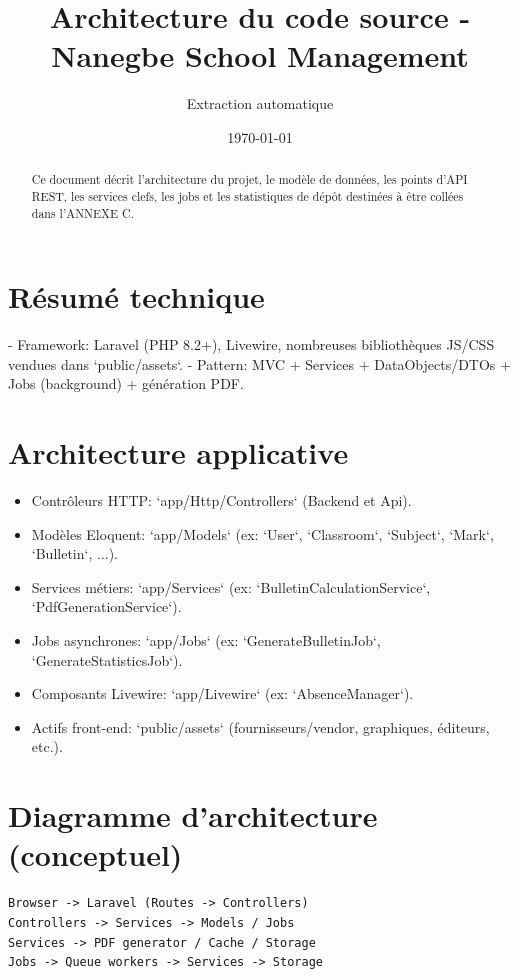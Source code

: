 \documentclass[a4paper,11pt]{article}
\title{Architecture du code source - Nanegbe School Management}
\author{Extraction automatique}
\date{\today}
\begin{document}
\maketitle
\begin{abstract}
Ce document décrit l'architecture du projet, le modèle de données, les points d'API REST, les services clefs, les jobs et les statistiques de dépôt destinées à être collées dans l'ANNEXE C.
\end{abstract}

\section{Résumé technique}
- Framework: Laravel (PHP 8.2+), Livewire, nombreuses bibliothèques JS/CSS vendues dans `public/assets`.
- Pattern: MVC + Services + DataObjects/DTOs + Jobs (background) + génération PDF.

\section{Architecture applicative}
\begin{itemize}
  \item Contrôleurs HTTP: `app/Http/Controllers` (Backend et Api).
  \item Modèles Eloquent: `app/Models` (ex: `User`, `Classroom`, `Subject`, `Mark`, `Bulletin`, ...).
  \item Services métiers: `app/Services` (ex: `BulletinCalculationService`, `PdfGenerationService`).
  \item Jobs asynchrones: `app/Jobs` (ex: `GenerateBulletinJob`, `GenerateStatisticsJob`).
  \item Composants Livewire: `app/Livewire` (ex: `AbsenceManager`).
  \item Actifs front-end: `public/assets` (fournisseurs/vendor, graphiques, éditeurs, etc.).
\end{itemize}

\section{Diagramme d'architecture (conceptuel)}
\begin{verbatim}
Browser -> Laravel (Routes -> Controllers)
Controllers -> Services -> Models / Jobs
Services -> PDF generator / Cache / Storage
Jobs -> Queue workers -> Services -> Storage
\end{verbatim}
\end{document}
